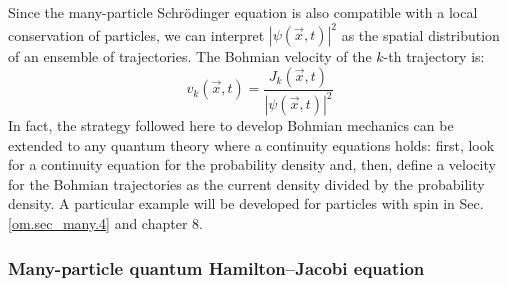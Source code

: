 \documentclass[onecolumn,nofootinbib, secnumarabic, amsmath, nobibnotes,11pt,aps,pra]{revtex4-1}
\newcommand{\sref}[1]{Sec. \ref{#1}}
\begin{document}
Since the many-particle Schr\"odinger equation is also compatible with a local conservation of particles, we can interpret $|\psi(\vec{x},t)|^2$ as the spatial distribution of an ensemble of trajectories. The Bohmian velocity of the $k$-th trajectory is:
\begin{equation}
\label{om.velocityND}
v_k(\vec{x},t) = \frac{J_k(\vec{x},t)} {|\psi(\vec{x},t)|^2}
\end{equation}
In fact, the strategy followed here to develop Bohmian mechanics can be extended to any quantum theory where a continuity equations holds: first, look for a continuity equation for the probability density and, then, define a velocity for the Bohmian trajectories as the current density divided by the probability density.
A particular example will be developed for particles with spin in \sref{om.sec_many.4} and chapter 8.

\subsubsection{Many-particle quantum Hamilton--Jacobi equation}
\end{document}
